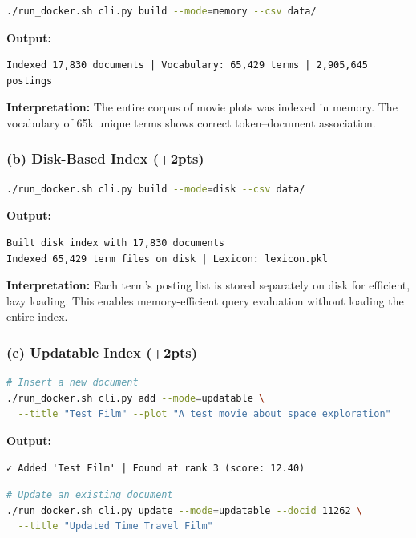 \documentclass[11pt,a4paper]{article}
\begin{document}
\begin{lstlisting}[language=bash]
./run_docker.sh cli.py build --mode=memory --csv data/
\end{lstlisting}
\newpage
\noindent\textbf{Output:}
\begin{lstlisting}
Indexed 17,830 documents | Vocabulary: 65,429 terms | 2,905,645 postings
\end{lstlisting}

\noindent\textbf{Interpretation:}
The entire corpus of movie plots was indexed in memory.  
The vocabulary of 65k unique terms shows correct token–document association.

\subsubsection*{(b) Disk-Based Index (+2pts)}

\begin{lstlisting}[language=bash]
./run_docker.sh cli.py build --mode=disk --csv data/
\end{lstlisting}

\noindent\textbf{Output:}
\begin{lstlisting}
Built disk index with 17,830 documents
Indexed 65,429 term files on disk | Lexicon: lexicon.pkl
\end{lstlisting}

\noindent\textbf{Interpretation:}  
Each term’s posting list is stored separately on disk for efficient, lazy loading.  
This enables memory-efficient query evaluation without loading the entire index.

\subsubsection*{(c) Updatable Index (+2pts)}

\begin{lstlisting}[language=bash]
# Insert a new document
./run_docker.sh cli.py add --mode=updatable \
  --title "Test Film" --plot "A test movie about space exploration"
\end{lstlisting}

\noindent\textbf{Output:}
\begin{lstlisting}
✓ Added 'Test Film' | Found at rank 3 (score: 12.40)
\end{lstlisting}

\begin{lstlisting}[language=bash]
# Update an existing document
./run_docker.sh cli.py update --mode=updatable --docid 11262 \
  --title "Updated Time Travel Film"
\end{lstlisting}
\end{document}
